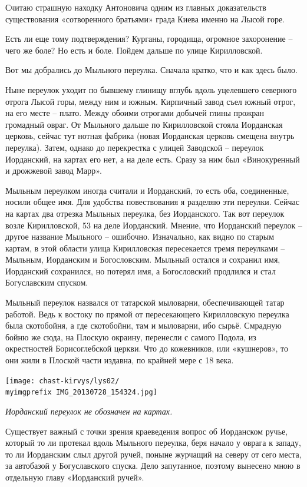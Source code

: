 Считаю страшную находку Антоновича одним из главных доказательств существования «сотворенного братьями» града Киева именно на Лысой горе.

Есть ли еще тому подтверждения? Курганы, городища, огромное захоронение – чего же боле? Но есть и боле. Пойдем дальше по улице Кирилловской.

Вот мы добрались до Мыльного переулка. Сначала кратко, что и как здесь было.

Ныне переулок уходит по бывшему глинищу вглубь вдоль уцелевшего северного отрога Лысой горы, между ним и южным. Кирпичный завод съел южный отрог, на его месте – плато. Между обоими отрогами добычей глины прожран громадный овраг. От Мыльного дальше по Кирилловской стояла Иорданская церковь, сейчас тут нотная фабрика (новая Иорданская церковь смещена внутрь переулка). Затем, однако до перекрестка с улицей Заводской – переулок Иорданский, на картах его нет, а на деле есть. Сразу за ним был «Винокуренный и дрожжевой завод Марр».

Мыльным переулком иногда считали и Иорданский, то есть оба, соединенные, носили общее имя. Для удобства повествования я разделяю эти переулки. Сейчас на картах два отрезка Мыльных переулка, без Иорданского. Так вот переулок возле Кирилловской, 53 на деле Иорданский. Мнение, что Иорданский переулок – другое название Мыльного – ошибочно. Изначально, как видно по старым картам, в этой области улица Кирилловская пересекается тремя переулками – Мыльным, Иорданским и Богословским. Мыльный остался и сохранил имя, Иорданский сохранился, но потерял имя, а Богословский продлился и стал Богуславским спуском.

Мыльный переулок назвался от татарской мыловарни, обеспечивающей татар работой. Ведь к востоку по прямой от пересекающего Кирилловскую переулка была скотобойня, а где скотобойни, там и мыловарни, ибо сырьё. Смрадную бойню же сюда, на Плоскую окраину, перенесли с самого Подола, из окрестностей Борисоглебской церкви. Что до кожевников, или «кушнеров», то они жили в Плоской части издавна, по крайней мере с 18 века.

\begin{center}
\texttt{[image: chast-kirvys/lys02/\\myimgprefix IMG\_20130728\_154324.jpg]}

\textit{Иорданский переулок не обозначен на картах.}
\end{center}

Существует важный с точки зрения краеведения вопрос об Иорданском ручье, который то ли протекал вдоль Мыльного переулка, беря начало у оврага к западу, то ли Иорданским слыл другой ручей, поныне журчащий на северу от сего места, за автобазой у Богуславского спуска. Дело запутанное, поэтому вынесено мною в отдельную главу «Иорданский ручей».

